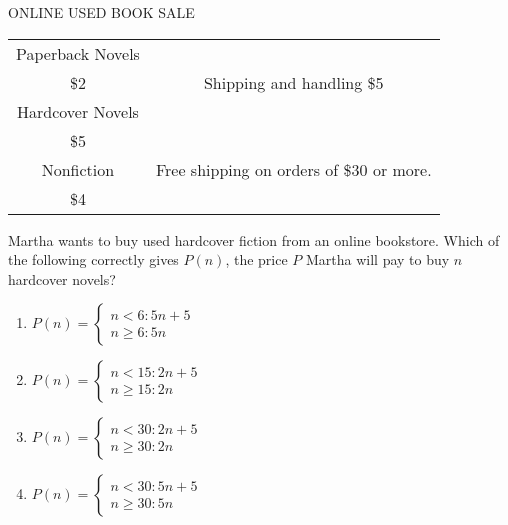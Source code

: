 
\begin{center}
ONLINE USED BOOK SALE
\begin{tabular}{|c|c|}\hline
Paperback Novels\rule{0mm}{5mm} & \multirow{3}{1 in}{Shipping and handling \$5}\\
\$2 & \\ \cline{1-1}
Hardcover Novels\rule{0mm}{5mm} & \\ \cline{2-2}
\$5 & \multirow{3}{1.4 in}{Free shipping on orders of \$30 or more.}\\\cline{1-1}
Nonfiction & \\
\$4 & \\\hline
\end{tabular}
\end{center}
Martha wants to buy used hardcover fiction from an online bookstore.  Which of the following correctly gives $P(n)$, the price $P$ Martha will pay to buy $n$ hardcover novels?


\ifsat
	\begin{enumerate}[label=\Alph*)]
		\item $P(n)=\left\{\begin{array}{l}n<6: 5n+5\\n\geq6: 5n\end{array}\right.$ %
		\item $P(n)=\left\{\begin{array}{l}n<15: 2n+5\\n\geq15: 2n \end{array}\right.$
		\item $P(n)=\left\{\begin{array}{l}n<30: 2n+5\\n\geq30: 2n \end{array}\right.$
		\item $P(n)=\left\{\begin{array}{l}n<30: 5n+5\\n\geq30: 5n \end{array}\right.$
	\end{enumerate}
\else
\fi

